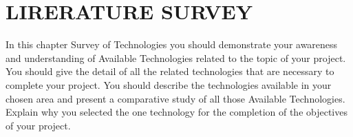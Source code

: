
\chapter{LIRERATURE SURVEY} %

\label{Chapter2} %


In this chapter Survey of Technologies you should demonstrate your awareness and understanding of Available Technologies related to the topic of your project. You should give the detail of all the related technologies that are necessary to complete your project. You should describe the technologies available in your chosen area and present a comparative study of all those Available Technologies. Explain why you selected the one technology for the completion of the objectives of your project.